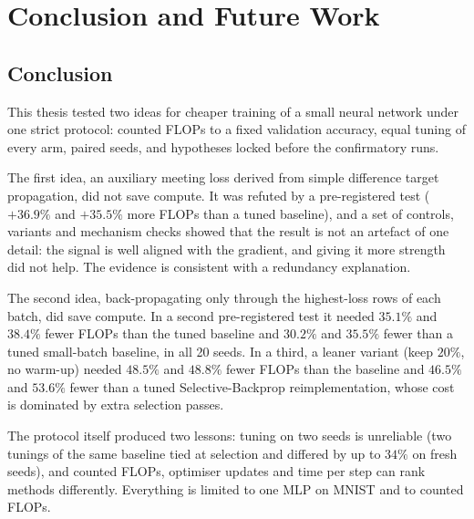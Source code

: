 \chapter{Conclusion and Future Work}\label{ch:conclusion}

\section{Conclusion}
This thesis tested two ideas for cheaper training of a small neural network under one strict protocol: counted FLOPs to a fixed validation accuracy, equal tuning of every arm, paired seeds, and hypotheses locked before the confirmatory runs.

The first idea, an auxiliary meeting loss derived from simple difference target propagation, did not save compute. It was refuted by a pre-registered test ($+36.9\%$ and $+35.5\%$ more FLOPs than a tuned baseline), and a set of controls, variants and mechanism checks showed that the result is not an artefact of one detail: the signal is well aligned with the gradient, and giving it more strength did not help. The evidence is consistent with a redundancy explanation.

The second idea, back-propagating only through the highest-loss rows of each batch, did save compute. In a second pre-registered test it needed $35.1\%$ and $38.4\%$ fewer FLOPs than the tuned baseline and $30.2\%$ and $35.5\%$ fewer than a tuned small-batch baseline, in all 20 seeds. In a third, a leaner variant (keep $20\%$, no warm-up) needed $48.5\%$ and $48.8\%$ fewer FLOPs than the baseline and $46.5\%$ and $53.6\%$ fewer than a tuned Selective-Backprop reimplementation, whose cost is dominated by extra selection passes.

The protocol itself produced two lessons: tuning on two seeds is unreliable (two tunings of the same baseline tied at selection and differed by up to $34\%$ on fresh seeds), and counted FLOPs, optimiser updates and time per step can rank methods differently. Everything is limited to one MLP on MNIST and to counted FLOPs.

